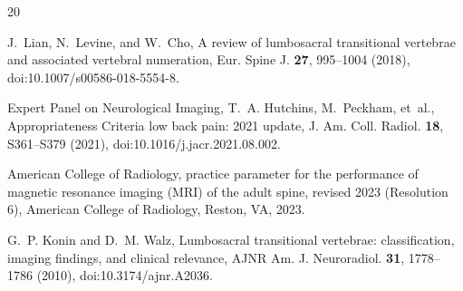 \documentclass[aapm,mph,amsmath,amssymb,reprint]{revtex4-2}
\begin{document}
\begin{thebibliography}{20}
%
%
\sloppy

J.~Lian, N.~Levine, and W.~Cho,
\newblock A review of lumbosacral transitional vertebrae and associated vertebral numeration,
\newblock Eur. Spine J. {\bf 27}, 995--1004 (2018),
\newblock doi:10.1007/s00586-018-5554-8.

Expert Panel on Neurological Imaging, T.~A. Hutchins, M.~Peckham, et~al.,
 {Appropriateness} {Criteria} low back pain: 2021 update,
\newblock J. Am. Coll. Radiol. {\bf 18}, S361--S379 (2021),
\newblock doi:10.1016/j.jacr.2021.08.002.

American College of Radiology,
 practice parameter for the performance of magnetic resonance imaging ({MRI}) of the adult spine, revised 2023 (Resolution 6),
\newblock American College of Radiology, Reston, VA, 2023.

G.~P. Konin and D.~M. Walz,
\newblock Lumbosacral transitional vertebrae: classification, imaging findings, and clinical relevance,
\newblock AJNR Am. J. Neuroradiol. {\bf 31}, 1778--1786 (2010),
\newblock doi:10.3174/ajnr.A2036.


\end{thebibliography}
\end{document}
